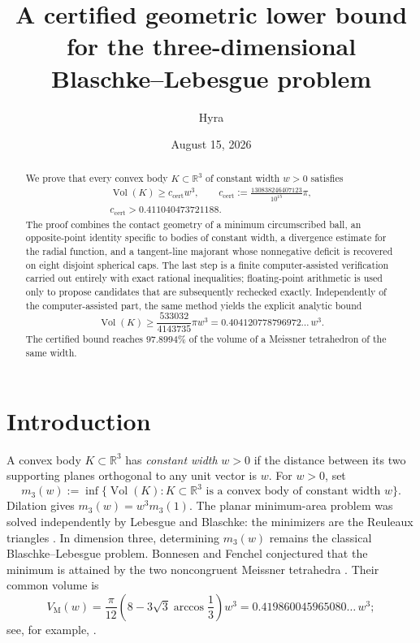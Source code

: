 \documentclass[11pt,reqno]{amsart}
\title[A certified lower bound for the Blaschke--Lebesgue problem]
{A certified geometric lower bound for the three-dimensional Blaschke--Lebesgue problem}
\author{Hyra}
\date{August 15, 2026}
\numberwithin{equation}{section}
\theoremstyle{definition}
\theoremstyle{remark}
\newcommand{\R}{\mathbb{R}}
\newcommand{\Vol}{\operatorname{Vol}}
\newcommand{\cstar}{c_{\mathrm{cert}}}
\begin{document}
\begin{abstract}
We prove that every convex body $K\subset\R^{3}$ of constant width $w>0$ satisfies
\[
 \begin{gathered}
 \Vol(K)\geq \cstar w^{3},\qquad
 \cstar:=\frac{130838246407123}{10^{15}}\pi,\\
 \cstar>0.411040473721188.
 \end{gathered}
\]
The proof combines the contact geometry of a minimum circumscribed ball, an opposite-point identity specific to bodies of constant width, a divergence estimate for the radial function, and a tangent-line majorant whose nonnegative deficit is recovered on eight disjoint spherical caps. The last step is a finite computer-assisted verification carried out entirely with exact rational inequalities; floating-point arithmetic is used only to propose candidates that are subsequently rechecked exactly. Independently of the computer-assisted part, the same method yields the explicit analytic bound
\[
 \Vol(K)\geq \frac{533032}{4143735}\pi w^{3}
 =0.404120778796972\ldots\,w^{3}.
\]
The certified bound reaches $97.8994\%$ of the volume of a Meissner tetrahedron of the same width.
\end{abstract}

\maketitle

\section{Introduction}

A convex body $K\subset\R^{3}$ has \emph{constant width} $w>0$ if the distance between its two supporting planes orthogonal to any unit vector is $w$. For $w>0$, set
\[
 m_3(w):=\inf\{\Vol(K):K\subset\R^3\text{ is a convex body of constant width }w\}.
\]
Dilation gives $m_3(w)=w^3m_3(1)$. The planar minimum-area problem was solved independently by Lebesgue and Blaschke: the minimizers are the Reuleaux triangles \cite{Lebesgue1914,Blaschke1915}. In dimension three, determining $m_3(w)$ remains the classical Blaschke--Lebesgue problem. Bonnesen and Fenchel conjectured that the minimum is attained by the two noncongruent Meissner tetrahedra \cite{BonnesenFenchel1934,MeissnerSchilling1912,KawohlWeber2011}. Their common volume is
\begin{equation}\label{eq:Meissner-volume}
 V_{\mathrm M}(w)
 =\frac{\pi}{12}\left(8-3\sqrt3\arccos\frac13\right)w^{3}
 =0.419860045965080\ldots\,w^{3};
\end{equation}
see, for example, \cite{ArmanEtAl2024,Bogosel2026}.
\end{document}
